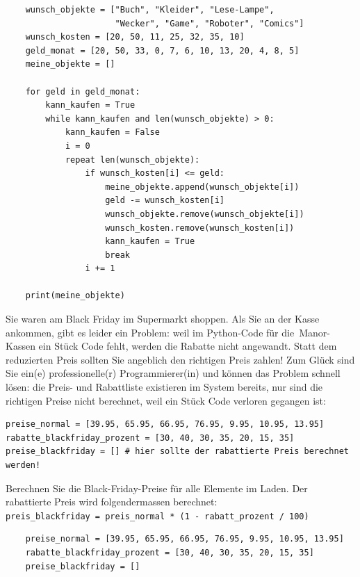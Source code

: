 \begin{questions}
\begin{solution}
    \begin{lstlisting}
    wunsch_objekte = ["Buch", "Kleider", "Lese-Lampe",
                      "Wecker", "Game", "Roboter", "Comics"]
    wunsch_kosten = [20, 50, 11, 25, 32, 35, 10]
    geld_monat = [20, 50, 33, 0, 7, 6, 10, 13, 20, 4, 8, 5]
    meine_objekte = []

    for geld in geld_monat:
        kann_kaufen = True
        while kann_kaufen and len(wunsch_objekte) > 0:
            kann_kaufen = False
            i = 0
            repeat len(wunsch_objekte):
                if wunsch_kosten[i] <= geld:
                    meine_objekte.append(wunsch_objekte[i])
                    geld -= wunsch_kosten[i]
                    wunsch_objekte.remove(wunsch_objekte[i])
                    wunsch_kosten.remove(wunsch_kosten[i])
                    kann_kaufen = True
                    break
                i += 1

    print(meine_objekte)
    \end{lstlisting}

  \end{solution}

\clearpage
{}

Sie waren am Black Friday im Supermarkt shoppen. Als Sie an der Kasse ankommen, gibt es leider ein Problem: weil im Python-Code für die Manor-Kassen ein Stück Code fehlt, werden die Rabatte nicht angewandt. Statt dem reduzierten Preis sollten Sie angeblich den richtigen Preis zahlen! Zum Glück sind Sie ein(e) professionelle(r) Programmierer(in) und können das Problem schnell lösen: die Preis- und Rabattliste existieren im System bereits, nur sind die richtigen Preise nicht berechnet, weil ein Stück Code verloren gegangen ist:
\begin{lstlisting}
preise_normal = [39.95, 65.95, 66.95, 76.95, 9.95, 10.95, 13.95]
rabatte_blackfriday_prozent = [30, 40, 30, 35, 20, 15, 35]
preise_blackfriday = [] # hier sollte der rabattierte Preis berechnet werden!
\end{lstlisting}
Berechnen Sie die Black-Friday-Preise für alle Elemente im Laden. Der rabattierte Preis wird folgendermassen berechnet:\\
	\lstinline|preis_blackfriday = preis_normal * (1 - rabatt_prozent / 100)|
	\begin{solution}
    \begin{lstlisting}
    preise_normal = [39.95, 65.95, 66.95, 76.95, 9.95, 10.95, 13.95]
    rabatte_blackfriday_prozent = [30, 40, 30, 35, 20, 15, 35]
    preise_blackfriday = []


\end{lstlisting}
\end{solution}
\end{questions}
